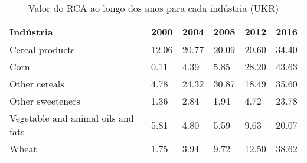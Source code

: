 \begin{table}
\centering
\caption{Valor do RCA ao longo dos anos para cada indústria (UKR)}
\begin{tabular}{p{6cm}p{1.5cm}p{1.5cm}p{1.5cm}p{1.5cm}p{1.5cm}}
\toprule
                         Indústria &  2000 &  2004 &  2008 &  2012 &  2016 \\
\midrule
                   Cereal products & 12.06 & 20.77 & 20.09 & 20.60 & 34.40 \\
                              Corn &  0.11 &  4.39 &  5.85 & 28.20 & 43.63 \\
                     Other cereals &  4.78 & 24.32 & 30.87 & 18.49 & 35.60 \\
                  Other sweeteners &  1.36 &  2.84 &  1.94 &  4.72 & 23.78 \\
Vegetable and animal oils and fats &  5.81 &  4.80 &  5.59 &  9.63 & 20.07 \\
                             Wheat &  1.75 &  3.94 &  9.72 & 12.50 & 38.62 \\
\bottomrule
\end{tabular}
\end{table}
